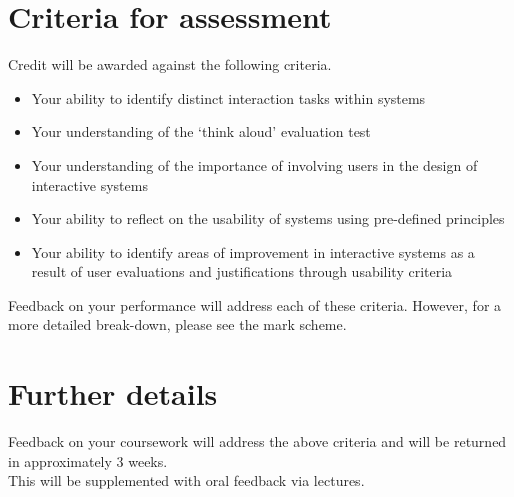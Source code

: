 \documentclass[11pt,a4paper]{report}
\begin{document}
\section*{Criteria for assessment}
Credit will be awarded against the following criteria.
\begin{itemize}
    \item Your ability to identify distinct interaction tasks within systems    
    \item Your understanding of the `think aloud' evaluation test
    \item Your understanding of the importance of involving users in the design of interactive systems
    \item Your ability to reflect on the usability of systems using pre-defined principles
    \item Your ability to identify areas of improvement in interactive systems as a result of user evaluations and justifications through usability criteria
\end{itemize}
Feedback on your performance will address each of these criteria. However, for a more detailed break-down, please see the mark scheme.

\section*{Further details}
Feedback on your coursework will address the above criteria and will be returned in approximately 3 weeks.\\
This will be supplemented with oral feedback via lectures.
\end{document}
